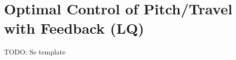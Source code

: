 \section{Optimal Control of Pitch/Travel with Feedback (LQ)}\label{sec:prob3}
TODO: Se template













